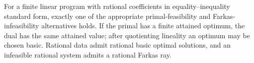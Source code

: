 For a finite linear program with rational coefficients in equality--inequality standard form, exactly one of the appropriate primal-feasibility and Farkas-infeasibility alternatives holds.  If the primal has a finite attained optimum, the dual has the same attained value; after quotienting lineality an optimum may be chosen basic.  Rational data admit rational basic optimal solutions, and an infeasible rational system admits a rational Farkas ray.
